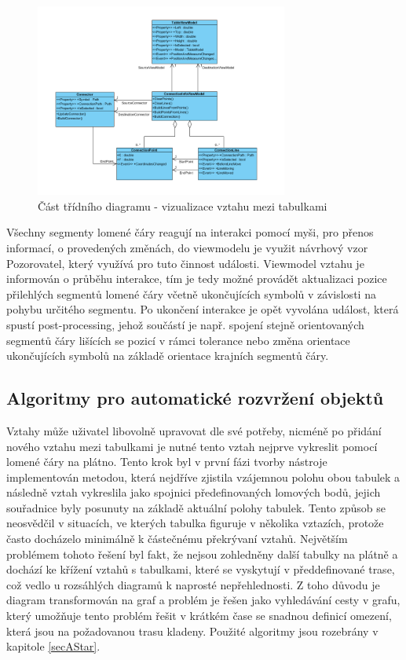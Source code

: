 \documentclass[czech,bachelor,public,dept460,male,oneside]{diploma}
\begin{document}
		\begin{figure}[!h]
			\centering
			\includegraphics[width=0.74\textwidth]{Figures/EditorVztahy}
			\caption{Část třídního diagramu - vizualizace vztahu mezi tabulkami}
			\label{fig:classDiagMovePolyline}
		\end{figure}
		
		Všechny segmenty lomené čáry reagují na interakci pomocí myši, pro přenos informací, o provedených změnách, do viewmodelu je využit návrhový vzor Pozorovatel, který využívá pro tuto činnost události. Viewmodel vztahu je informován o průběhu interakce, tím je tedy možné provádět aktualizaci pozice přilehlých segmentů lomené čáry včetně ukončujících symbolů v závislosti na pohybu určitého segmentu. Po ukončení interakce je opět vyvolána událost, která spustí post-processing, jehož součástí je např. spojení stejně orientovaných segmentů čáry lišících se pozicí v rámci tolerance nebo změna orientace ukončujících symbolů na základě orientace krajních segmentů čáry.
		
	\subsection{Algoritmy pro automatické rozvržení objektů}
	Vztahy může uživatel libovolně upravovat dle své potřeby, nicméně po přidání nového vztahu mezi tabulkami je nutné tento vztah nejprve vykreslit pomocí lomené čáry na plátno. Tento krok byl v první fázi tvorby nástroje implementován metodou, která nejdříve zjistila vzájemnou polohu obou tabulek a následně vztah vykreslila jako spojnici předefinovaných lomových bodů, jejich souřadnice byly posunuty na základě aktuální polohy tabulek. Tento způsob se neosvědčil v situacích, ve kterých tabulka figuruje v několika vztazích, protože často docházelo minimálně k částečnému překrývaní vztahů. Největším problémem tohoto řešení byl fakt, že nejsou zohledněny další tabulky na plátně a dochází ke křížení vztahů s tabulkami, které se vyskytují v předdefinované trase, což vedlo u rozsáhlých diagramů k naprosté nepřehlednosti. Z toho důvodu je diagram transformován na graf a problém je řešen jako vyhledávání cesty v grafu, který umožňuje tento problém řešit v krátkém čase se snadnou definicí omezení, která jsou na požadovanou trasu kladeny. Použité algoritmy jsou rozebrány v kapitole \ref{secAStar}.
	
\end{document}
